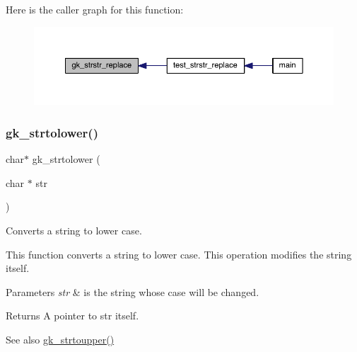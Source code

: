 Here is the caller graph for this function\+:\nopagebreak
\begin{figure}[H]
\begin{center}
\leavevmode
\includegraphics[width=350pt]{a00143_a46e5cf8f76a1ece74adf1b8b9dfcb275_icgraph}
\end{center}
\end{figure}
\mbox{\label{a00143_aa2d603de6c132e340d85e8e125d847a0}} 
\subsubsection{\texorpdfstring{gk\+\_\+strtolower()}{gk\_strtolower()}}
{\footnotesize\ttfamily char$\ast$ gk\+\_\+strtolower (\begin{DoxyParamCaption}\item[{char $\ast$}]{str }\end{DoxyParamCaption})}



Converts a string to lower case. 

This function converts a string to lower case. This operation modifies the string itself.


\begin{DoxyParams}{Parameters}
{\em str} & is the string whose case will be changed. \\
\hline
\end{DoxyParams}
\begin{DoxyReturn}{Returns}
A pointer to {\ttfamily str} itself. 
\end{DoxyReturn}
\begin{DoxySeeAlso}{See also}
\hyperlink{a00143_ae2e962be7af156e5200766fa8543cff1}{gk\+\_\+strtoupper()} 
\end{DoxySeeAlso}
\mbox{\label{a00143_ae2e962be7af156e5200766fa8543cff1}} 
